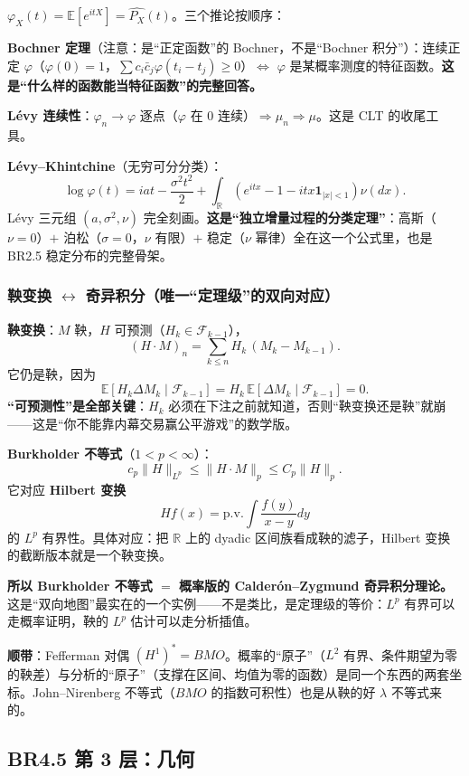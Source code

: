 $\varphi_X(t)=\mathbb{E}[e^{itX}]=\hat{P_X}(t)$。三个推论按顺序：

\textbf{Bochner 定理}（注意：是“正定函数”的 Bochner，不是“Bochner 积分”）：连续正定 $\varphi$（$\varphi(0)=1$，$\sum c_i\bar c_j\varphi(t_i-t_j)\ge0$）$\iff$ $\varphi$ 是某概率测度的特征函数。\textbf{这是“什么样的函数能当特征函数”的完整回答。}

\textbf{L\'evy 连续性}：$\varphi_n\to\varphi$ 逐点（$\varphi$ 在 $0$ 连续）$\Rightarrow\mu_n\Rightarrow\mu$。这是 CLT 的收尾工具。

\textbf{L\'evy--Khintchine}（无穷可分分类）：
\[
\log\varphi(t)=iat-\frac{\sigma^2t^2}{2}+\int_{\mathbb{R}}\left(e^{itx}-1-itx\mathbf{1}_{|x|<1}\right)\nu(dx).
\]
L\'evy 三元组 $(a,\sigma^2,\nu)$ 完全刻画。\textbf{这是“独立增量过程的分类定理”}：高斯（$\nu=0$）$+$ 泊松（$\sigma=0$，$\nu$ 有限）$+$ 稳定（$\nu$ 幂律）全在这一个公式里，也是 BR2.5 稳定分布的完整骨架。

\subsubsection{鞅变换 $\leftrightarrow$ 奇异积分（唯一“定理级”的双向对应）}

\textbf{鞅变换}：$M$ 鞅，$H$ 可预测（$H_k\in\mathcal{F}_{k-1}$），
\[
(H\cdot M)_n=\sum_{k\le n}H_k\,(M_k-M_{k-1}).
\]
它仍是鞅，因为
\[
\mathbb{E}[H_k\Delta M_k\mid\mathcal{F}_{k-1}]
=H_k\,\mathbb{E}[\Delta M_k\mid\mathcal{F}_{k-1}]=0 .
\]
\textbf{“可预测性”是全部关键}：$H_k$ 必须在下注之前就知道，否则“鞅变换还是鞅”就崩——这是“你不能靠内幕交易赢公平游戏”的数学版。

\textbf{Burkholder 不等式}（$1<p<\infty$）：
\[
c_p\lVert H\rVert_{L^p}\le\lVert H\cdot M\rVert_p\le C_p\lVert H\rVert_p .
\]
它对应 \textbf{Hilbert 变换}
\[
Hf(x)=\mathrm{p.v.}\int\frac{f(y)}{x-y}dy
\]
的 $L^p$ 有界性。具体对应：把 $\mathbb{R}$ 上的 dyadic 区间族看成鞅的滤子，Hilbert 变换的截断版本就是一个鞅变换。

\textbf{所以 Burkholder 不等式 $=$ 概率版的 Calder\'on--Zygmund 奇异积分理论。} 这是“双向地图”最实在的一个实例——不是类比，是定理级的等价：$L^p$ 有界可以走概率证明，鞅的 $L^p$ 估计可以走分析插值。

\textbf{顺带}：Fefferman 对偶 $(H^1)^*=BMO$。概率的“原子”（$L^2$ 有界、条件期望为零的鞅差）与分析的“原子”（支撑在区间、均值为零的函数）是同一个东西的两套坐标。John--Nirenberg 不等式（$BMO$ 的指数可积性）也是从鞅的好 $\lambda$ 不等式来的。

\subsection{BR4.5 第 3 层：几何}

